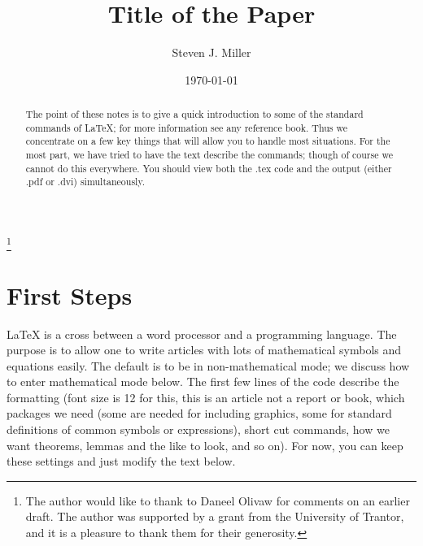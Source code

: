 \documentclass[12pt,reqno]{amsart}
\numberwithin{equation}{section}
\begin{document}
\title{Title of the Paper}

\author{Steven J. Miller}
 \address{Department of
  Mathematics and Statistics, Williams College, Williamstown, MA 01267}




\date{\today}

\thanks{The author would like to thank to Daneel Olivaw for comments on an earlier draft. The author was supported by a grant from the University of Trantor, and it is a pleasure to thank them for their generosity.}

\begin{abstract}
The point of these notes is to give a quick introduction to some
of the standard commands of LaTeX; for more information see any
reference book. Thus we concentrate on a few key things that will
allow you to handle most situations. For the most part, we have
tried to have the text describe the commands; though of course we
cannot do this everywhere. You should view both the .tex code and
the output (either .pdf or .dvi) simultaneously.
\end{abstract}

\maketitle

\tableofcontents

\section{First Steps}

LaTeX is a cross between a word processor and a programming
language. The purpose is to allow one to write articles with lots
of mathematical symbols and equations easily. The default is to be
in non-mathematical mode; we discuss how to enter mathematical
mode below. The first few lines of the code describe the
formatting (font size is 12 for this, this is an article not a
report or book, which packages we need (some are needed for
including graphics, some for standard definitions of common
symbols or expressions), short cut commands, how we want theorems,
lemmas and the like to look, and so on). For now, you can keep
these settings and just modify the text below.
\end{document}
